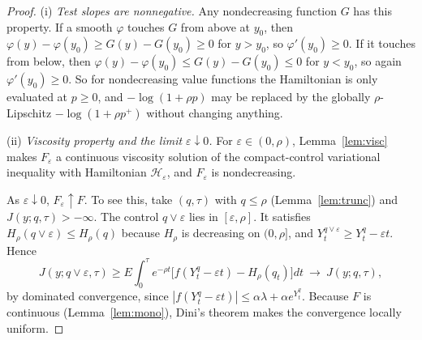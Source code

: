 \begin{proof}
(i) \emph{Test slopes are nonnegative.} Any nondecreasing function $G$ has this property. If a smooth $\varphi$ touches $G$ from above at $y_0$, then $\varphi(y)-\varphi(y_0)\ge G(y)-G(y_0)\ge0$ for $y>y_0$, so $\varphi'(y_0)\ge0$. If it touches from below, then $\varphi(y)-\varphi(y_0)\le G(y)-G(y_0)\le0$ for $y<y_0$, so again $\varphi'(y_0)\ge0$. So for nondecreasing value functions the Hamiltonian is only evaluated at $p\ge0$, and $-\log(1+\rho p)$ may be replaced by the globally $\rho$-Lipschitz $-\log(1+\rho p^+)$ without changing anything.

(ii) \emph{Viscosity property and the limit $\varepsilon\downarrow0$.} For $\varepsilon\in(0,\rho)$, Lemma~\ref{lem:visc} makes $F_\varepsilon$ a continuous viscosity solution of the compact-control variational inequality with Hamiltonian $\mathcal H_\varepsilon$, and $F_\varepsilon$ is nondecreasing.

As $\varepsilon\downarrow0$, $F_\varepsilon\uparrow F$. To see this, take $(q,\tau)$ with $q\le\rho$ (Lemma~\ref{lem:trunc}) and $J(y;q,\tau)>-\infty$. The control $q\vee\varepsilon$ lies in $[\varepsilon,\rho]$. It satisfies $H_\rho(q\vee\varepsilon)\le H_\rho(q)$ because $H_\rho$ is decreasing on $(0,\rho]$, and $Y^{q\vee\varepsilon}_t\ge Y^q_t-\varepsilon t$. Hence
\[
J(y;q\vee\varepsilon,\tau)\ge E\int_0^\tau e^{-\rho t}\big[f(Y^q_t-\varepsilon t)-H_\rho(q_t)\big]dt\ \longrightarrow\ J(y;q,\tau),
\]
by dominated convergence, since $|f(Y^q_t-\varepsilon t)|\le\alpha\lambda+\alpha e^{Y^q_t}$. Because $F$ is continuous (Lemma~\ref{lem:mono}), Dini's theorem makes the convergence locally uniform.


\end{proof}
